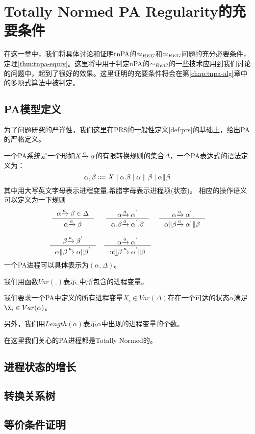 \chapter{Totally Normed PA Regularity的充要条件}
\label{chap:tnpa-equiv}

在这一章中，我们将具体讨论和证明tnPA的$\approx_{REG}$和$\simeq_{REG}$问题的充分必要条件，定理\ref{thm:tnpa-equiv}。这里将\cite{Kucera1996}中用于判定nPA的$\sim_{REG}$的一些技术应用到我们讨论的问题中，起到了很好的效果。这里证明的充要条件将会在第\ref{chap:tnpa-alg}章中的多项式算法中被判定。

\section{PA模型定义}
\label{sec:pa-def}

为了问题研究的严谨性，我们这里在PRS的一般性定义\ref{def:prs}的基础上，给出PA的严格定义。

\begin{defn}[PA 定义]\label{def:pa}
一个PA系统是一个形如$X{\xrightarrow{a}{}}\alpha$的有限转换规则的集合$\Delta$，一个PA表达式的语法定义为：
$$\alpha,\beta\Coloneqq X\mid \alpha.\beta\mid\alpha\parallel\beta\mid\alpha\llfloor\beta$$
其中用大写英文字母表示进程变量,希腊字母表示进程项(状态)。
相应的操作语义可以定义为一下规则
\[\begin{array}{ccc}
$\inference{\alpha\act{a}\beta\in\Delta}{\alpha\act{a}\beta}$ &
$\inference{\alpha\act{a}\alpha^{'}}{\alpha.\beta\act{a}\alpha^{'}.\beta}$ &
$\inference{\alpha\act{a}\alpha^{'}}{\alpha\| \beta\act{a}\alpha^{'}\|\beta}$ \\
 \\
$\inference{\beta\act{a}\beta^{'}}{\alpha\| \beta\act{a}\alpha \| \beta^{'}}$ &
$\inference{\alpha\act{a}\alpha^{'}}{\alpha\llfloor \beta\act{a}\alpha^{'}\|\beta}$ &
\end{array}\]
一个PA进程可以具体表示为$(\alpha,\Delta)$。
\end{defn}

我们用函数$Var(\_)$表示$\_$中所包含的进程变量。

我们要求一个PA中定义的所有进程变量$X_i\in Var(\Delta)$存在一个可达的状态$\alpha$满足$\X_i\in Var(\alpha)$。

另外，我们用$Length(\alpha)$表示$\alpha$中出现的进程变量的个数。

在这里我们关心的PA进程都是Totally Normed的。
\section{进程状态的增长}
\label{sec:grow-prop}

\section{转换关系树}
\label{sec:trans-tree}

\section{等价条件证明}
\label{sec:equiv-proof}

\begin{thm}\label{thm:tnpa-equiv}

\end{thm}

